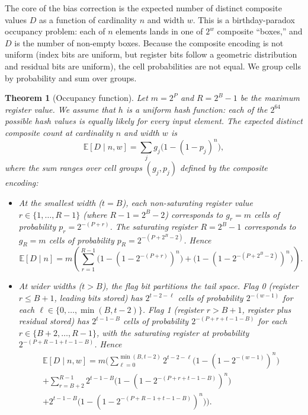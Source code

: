 \documentclass[11pt,letterpaper]{article}
\newtheorem{theorem}{Theorem}[section]
\begin{document}
The core of the bias correction is the expected number of distinct
composite values $D$ as a function of cardinality $n$ and width $w$.
This is a birthday-paradox occupancy problem: each of $n$ elements
lands in one of $2^w$ composite ``boxes,'' and $D$ is the number of
non-empty boxes. Because the composite encoding is not uniform
(index bits are uniform, but register bits follow a geometric
distribution and residual bits are uniform), the cell probabilities
are not equal. We group cells by probability and sum over groups.

\begin{theorem}[Occupancy function]
\label{thm:occupancy}
Let $m = 2^P$ and $R = 2^B - 1$ be the maximum register value.
We assume that $h$ is a uniform hash function: each of the $2^{64}$
possible hash values is equally likely for every input element.
The expected distinct composite
count at cardinality $n$ and width $w$ is
\[
\mathbb{E}[D \mid n, w] = \sum_{j} g_j \bigl(1 - (1 - p_j)^n\bigr),
\]
where the sum ranges over cell groups $(g_j, p_j)$ defined by the
composite encoding:
\begin{itemize}
  \item At the smallest width ($t = B$), each non-saturating register
    value $r \in \{1, \dots, R - 1\}$ (where $R - 1 = 2^B - 2$)
    corresponds to $g_r = m$ cells of probability
    $p_r = 2^{-(P+r)}$. The saturating register $R = 2^B - 1$
    corresponds to $g_R = m$ cells of probability
    $p_R = 2^{-(P+2^B-2)}$. Hence
    \begin{equation}
      \mathbb{E}[D \mid n] = m \left(
        \sum_{r=1}^{R-1} \bigl(1 - (1 - 2^{-(P+r)})^n\bigr)
        + \bigl(1 - (1 - 2^{-(P+2^B-2)})^n\bigr)
      \right).
      \label{eq:small}
    \end{equation}
  \item At wider widths ($t > B$), the flag bit partitions the tail
    space. Flag 0 (register $r \leq B + 1$, leading bits stored) has
    $2^{t-2-\ell}$ cells of probability $2^{-(w-1)}$ for each
    $\ell \in \{0, \dots, \min(B, t-2)\}$. Flag 1 (register $r > B +
    1$, register plus residual stored) has $2^{t-1-B}$ cells of
    probability $2^{-(P+r+t-1-B)}$ for each $r \in \{B+2, \dots,
    R-1\}$, with the saturating register at probability
    $2^{-(P+R-1+t-1-B)}$. Hence
    \begin{multline}
      \mathbb{E}[D \mid n, w] = m \biggl(
        \sum_{\ell=0}^{\min(B, t-2)} 2^{t-2-\ell}
        \bigl(1 - (1 - 2^{-(w-1)})^n\bigr) \\
        + \sum_{r=B+2}^{R-1} 2^{t-1-B}
        \bigl(1 - (1 - 2^{-(P+r+t-1-B)})^n\bigr) \\
        + 2^{t-1-B}
        \bigl(1 - (1 - 2^{-(P+R-1+t-1-B)})^n\bigr)
      \biggr).
      \label{eq:wide}
    \end{multline}
\end{itemize}
\end{theorem}
\end{document}
